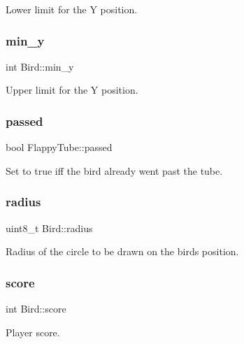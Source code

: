 Lower limit for the Y position. 

\mbox{\label{group__flappy_gaf9332ac0c4adb80502608cdfa72ff81b}} 
\subsubsection{\texorpdfstring{min\+\_\+y}{min\_y}}
{\footnotesize\ttfamily int Bird\+::min\+\_\+y}



Upper limit for the Y position. 

\mbox{\label{group__flappy_ga70babf0470365a943ad6743479a05726}} 
\subsubsection{\texorpdfstring{passed}{passed}}
{\footnotesize\ttfamily bool Flappy\+Tube\+::passed}



Set to true iff the bird already went past the tube. 

\mbox{\label{group__flappy_ga01e57038bda03482df87afc78bc2e0e1}} 
\subsubsection{\texorpdfstring{radius}{radius}}
{\footnotesize\ttfamily uint8\+\_\+t Bird\+::radius}



Radius of the circle to be drawn on the bird\textquotesingle{}s position. 

\mbox{\label{group__flappy_ga09a00f6fd91f17cf0d2b1b301c6a9da7}} 
\subsubsection{\texorpdfstring{score}{score}}
{\footnotesize\ttfamily int Bird\+::score}



Player score. 

